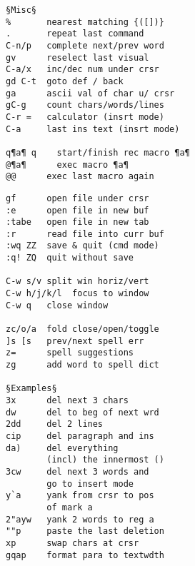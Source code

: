 \documentclass{article}
\begin{document}
\begin{multicols}{4}
\begin{lstlisting}
§Misc§
%       nearest matching {([])}
.       repeat last command
C-n/p   complete next/prev word
gv      reselect last visual
C-a/x   inc/dec num under crsr
gd C-t  goto def / back
ga      ascii val of char u/ crsr
gC-g    count chars/words/lines
C-r =   calculator (insrt mode)
C-a     last ins text (insrt mode)

q¶a¶ q    start/finish rec macro ¶a¶
@¶a¶      exec macro ¶a¶
@@      exec last macro again
\end{lstlisting}
\begin{lstlisting}
gf      open file under crsr
:e      open file in new buf
:tabe   open file in new tab
:r      read file into curr buf
:wq ZZ  save & quit (cmd mode)
:q! ZQ  quit without save

C-w s/v split win horiz/vert
C-w h/j/k/l  focus to window
C-w q   close window

zc/o/a  fold close/open/toggle
]s [s   prev/next spell err
z=      spell suggestions
zg      add word to spell dict

§Examples§
3x      del next 3 chars
dw      del to beg of next wrd
2dd     del 2 lines
cip     del paragraph and ins
da)     del everything
        (incl) the innermost ()
3cw     del next 3 words and
        go to insert mode
y`a     yank from crsr to pos
        of mark a
2"ayw   yank 2 words to reg a
""p     paste the last deletion
xp      swap chars at crsr
gqap    format para to textwdth
\end{lstlisting}
\end{multicols}
\end{document}
